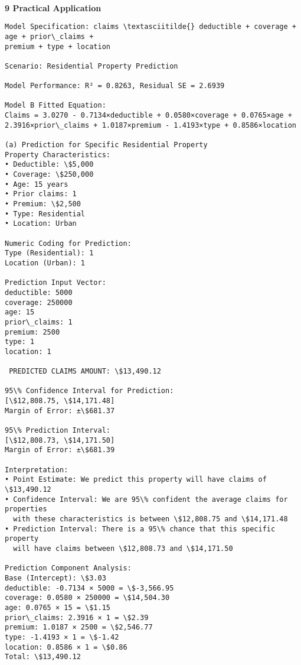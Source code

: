 \documentclass[8pt, twocolumn]{extarticle}
\begin{document}
    \begin{center}
    \end{center}
    { \hspace*{\fill} \\}
    \textbf{9 Practical Application}
    \begin{Verbatim}[commandchars=\\\{\}]
Model Specification: claims \textasciitilde{} deductible + coverage + age + prior\_claims +
premium + type + location

Scenario: Residential Property Prediction

Model Performance: R² = 0.8263, Residual SE = 2.6939

Model B Fitted Equation:
Claims = 3.0270 - 0.7134×deductible + 0.0580×coverage + 0.0765×age +
2.3916×prior\_claims + 1.0187×premium - 1.4193×type + 0.8586×location

(a) Prediction for Specific Residential Property
Property Characteristics:
• Deductible: \$5,000
• Coverage: \$250,000
• Age: 15 years
• Prior claims: 1
• Premium: \$2,500
• Type: Residential
• Location: Urban

Numeric Coding for Prediction:
Type (Residential): 1
Location (Urban): 1

Prediction Input Vector:
deductible: 5000
coverage: 250000
age: 15
prior\_claims: 1
premium: 2500
type: 1
location: 1

 PREDICTED CLAIMS AMOUNT: \$13,490.12

95\% Confidence Interval for Prediction:
[\$12,808.75, \$14,171.48]
Margin of Error: ±\$681.37

95\% Prediction Interval:
[\$12,808.73, \$14,171.50]
Margin of Error: ±\$681.39

Interpretation:
• Point Estimate: We predict this property will have claims of \$13,490.12
• Confidence Interval: We are 95\% confident the average claims for properties
  with these characteristics is between \$12,808.75 and \$14,171.48
• Prediction Interval: There is a 95\% chance that this specific property
  will have claims between \$12,808.73 and \$14,171.50

Prediction Component Analysis:
Base (Intercept): \$3.03
deductible: -0.7134 × 5000 = \$-3,566.95
coverage: 0.0580 × 250000 = \$14,504.30
age: 0.0765 × 15 = \$1.15
prior\_claims: 2.3916 × 1 = \$2.39
premium: 1.0187 × 2500 = \$2,546.77
type: -1.4193 × 1 = \$-1.42
location: 0.8586 × 1 = \$0.86
Total: \$13,490.12


\end{Verbatim}
\end{document}
